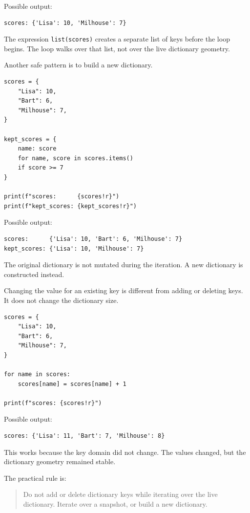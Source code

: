 Possible output:

\begin{verbatim}
scores: {'Lisa': 10, 'Milhouse': 7}
\end{verbatim}

The expression \texttt{list(scores)} creates a separate list of keys before the loop begins. The loop walks over that list, not over the live dictionary geometry.

Another safe pattern is to build a new dictionary.

\begin{verbatim}
scores = {
    "Lisa": 10,
    "Bart": 6,
    "Milhouse": 7,
}

kept_scores = {
    name: score
    for name, score in scores.items()
    if score >= 7
}

print(f"scores:      {scores!r}")
print(f"kept_scores: {kept_scores!r}")
\end{verbatim}

Possible output:

\begin{verbatim}
scores:      {'Lisa': 10, 'Bart': 6, 'Milhouse': 7}
kept_scores: {'Lisa': 10, 'Milhouse': 7}
\end{verbatim}

The original dictionary is not mutated during the iteration. A new dictionary is constructed instead.

Changing the value for an existing key is different from adding or deleting keys. It does not change the dictionary size.

\begin{verbatim}
scores = {
    "Lisa": 10,
    "Bart": 6,
    "Milhouse": 7,
}

for name in scores:
    scores[name] = scores[name] + 1

print(f"scores: {scores!r}")
\end{verbatim}

Possible output:

\begin{verbatim}
scores: {'Lisa': 11, 'Bart': 7, 'Milhouse': 8}
\end{verbatim}

This works because the key domain did not change. The values changed, but the dictionary geometry remained stable.

The practical rule is:

\begin{quote}
Do not add or delete dictionary keys while iterating over the live dictionary. Iterate over a snapshot, or build a new dictionary.
\end{quote}

